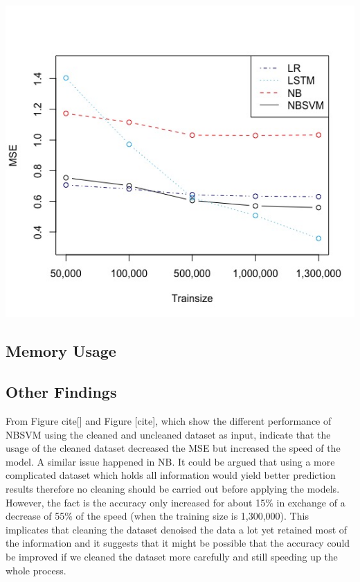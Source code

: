 \documentclass[letterpaper]{article} %
\begin{document}
\begin{center}
\centering
\includegraphics[width=\columnwidth]{../Plots/Compare_mse.jpeg}
\end{center}


\subsection{Memory Usage}


\subsection{Other Findings}
From Figure cite[] and Figure [cite], which show the different performance of NBSVM using the cleaned and uncleaned dataset as input, indicate that the usage of the cleaned dataset decreased the MSE but increased the speed of the model. A similar issue happened in NB. It could be argued that using a more complicated dataset which holds all information would yield better prediction results therefore no cleaning should be carried out before applying the models. However, the fact is the accuracy only increased for about 15\% in exchange of a decrease of 55\% of the speed (when the training size is 1,300,000). This implicates that cleaning the dataset denoised the data a lot yet retained most of the information and it suggests that it might be possible that the accuracy could be improved if we cleaned the dataset more carefully and still speeding up the whole process. 
\end{document}

